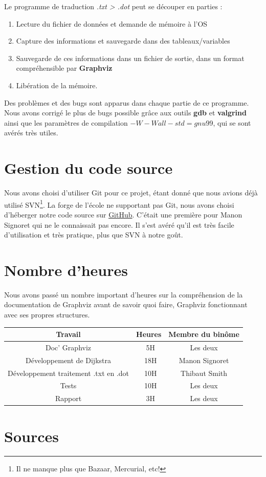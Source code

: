 \documentclass[12pt,a4paper]{report}
\begin{document}
\pagebreak
Le programme de traduction \textit{.txt > .dot} peut se découper en parties :


\begin{enumerate}
\item Lecture du fichier de données et demande de mémoire à l'OS 
\item Capture des informations et sauvegarde dans des tableaux/variables 
\item Sauvegarde de ces informations dans un fichier de sortie, dans un format compréhensible par \textbf{Graphviz}
\item Libération de la mémoire. 
\end{enumerate}

Des problèmes et des bugs sont apparus dans chaque partie de ce programme. Nous avons corrigé le plus de bugs possible grâce aux outils \textbf{gdb} et \textbf{valgrind} ainsi que les paramètres de compilation $-W -Wall -std=gnu99$, qui se sont avérés très utiles.

\section{Gestion du code source}
Nous avons choisi d'utiliser Git pour ce projet, \'{e}tant donn\'{e} que nous avions d\'{e}j\`{a} utilis\'{e} SVN\footnote{Il ne manque plus que Bazaar, Mercurial, etc!}. La forge de l'\'{e}cole ne supportant pas Git, nous avons choisi d'h\'{e}berger notre code source sur \href{https://github.com/Videl/Graph-Visualization-Manager}{GitHub}. C'était une première pour Manon Signoret qui ne le connaissait pas encore. Il s'est avéré qu'il est très facile d'utilisation et très pratique, plus que SVN à notre goût.

\section{Nombre d'heures}
Nous avons pass\'{e} un nombre important d'heures sur la compr\'{e}hension de la documentation de Graphviz avant de savoir quoi faire, Graphviz fonctionnant avec ses propres structures.

\begin{center}
\begin{tabular}{|c|c|c|}
  \hline
  Travail & Heures & Membre du binôme \\
  \hline
  Doc' Graphviz & ~5H & Les deux \\
  \hline
  D\'{e}veloppement de Dijkstra	&	~18H & Manon Signoret \\
  \hline
  D\'{e}veloppement traitement .txt en .dot	&	~10H & Thibaut Smith \\
  \hline
  Tests	&	~10H & Les deux\\ 
  \hline
  Rapport	&	~3H & Les deux\\
  \hline
\end{tabular}
\end{center}

\section{Sources}
\end{document}
